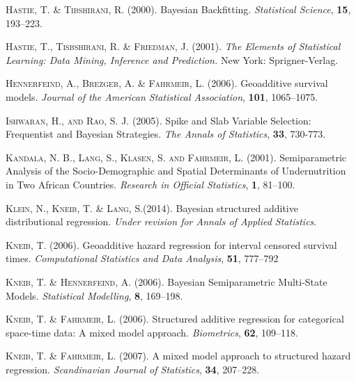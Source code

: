 \begin{thebibliography}{99}
 {\scshape Hastie, T. \& Tibshirani, R.} (2000).
 Bayesian Backfitting.
 {\it Statistical Science}, {\bf 15}, 193--223.

 {\scshape Hastie, T., Tisbshirani, R. \& Friedman, J.} (2001).
 {\it The Elements of Statistical Learning: Data Mining, Inference and Prediction.}
 New York: Sprigner-Verlag.

 {\scshape Hennerfeind, A., Brezger, A. \& Fahrmeir, L.} (2006).
 Geoadditive survival models.
 {\it Journal of the American Statistical Association}, {\bf 101}, 1065--1075.

 {\scshape Ishwaran, H., and Rao, S. J.} (2005). Spike and Slab Variable
 Selection: Frequentist and Bayesian Strategies. {\it The Annals of Statistics},
 {\bf 33}, 730-773.

 {\scshape Kandala, N. B., Lang, S., Klasen, S. and Fahrmeir, L.} (2001).
 Semiparametric Analysis of the Socio-Demographic and Spatial Determinants of Undernutrition in Two African Countries.
 {\it Research in Official Statistics}, {\bf 1}, 81--100.

{\scshape Klein, N., Kneib, T. \& Lang, S.}(2014).
Bayesian structured additive distributional regression.
{\it Under revision for Annals of Applied Statistics}.


 {\scshape Kneib, T.} (2006).
 Geoadditive hazard regression for interval censored survival times.
 {\it Computational Statistics and Data Analysis}, {\bf 51}, 777--792

 {\scshape Kneib, T. \& Hennerfeind, A.} (2006).
 Bayesian Semiparametric Multi-State Models.
 {\it Statistical Modelling}, {\bf 8}, 169--198.

 {\scshape Kneib, T. \& Fahrmeir, L.} (2006).
 Structured additive regression for categorical space-time data: A mixed model approach.
 {\it Biometrics}, {\bf 62}, 109--118.

 {\scshape Kneib, T. \& Fahrmeir, L.} (2007).
 A mixed model approach to structured hazard regression.
 {\it Scandinavian Journal of Statistics}, {\bf 34}, 207--228.


\end{thebibliography}
